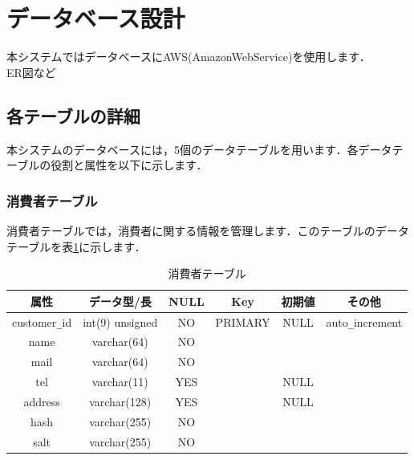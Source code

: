 \documentclass[a4j,titlepage]{jarticle}
\begin{document}
\section{データベース設計}
本システムではデータベースにAWS(AmazonWebService)を使用します．\\
ER図など
\subsection{各テーブルの詳細}
本システムのデータベースには，5個のデータテーブルを用います．各データテーブルの役割と属性を以下に示します．
\subsubsection{消費者テーブル}
消費者テーブルでは，消費者に関する情報を管理します．このテーブルのデータテーブルを表\ref{customer}に示します．
\begin{table}[htb]
  \caption{消費者テーブル}
  \label{customer}
  \begin{center}
    \begin{tabular}{|c|c|c|c|c|c|} \hline
      属性 & データ型/長 & NULL & Key & 初期値 & その他 \\ \hline \hline
      customer\verb|_|id & int(9) unsigned & NO & PRIMARY & NULL & auto\verb|_|increment\\ \hline
      name & varchar(64) & NO &   &  & \\ \hline
      mail & varchar(64) & NO &   &  & \\ \hline
      tel & varchar(11) & YES &   & NULL & \\ \hline
      address & varchar(128) & YES &   & NULL & \\ \hline
      hash & varchar(255) & NO &   &  & \\ \hline
      salt & varchar(255) & NO &   &  & \\ \hline
    \end{tabular}
  \end{center}
\end{table}
\end{document}
